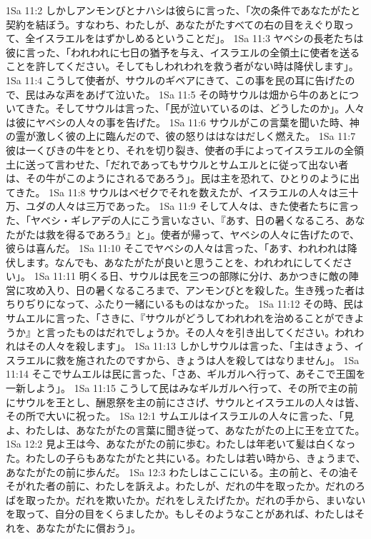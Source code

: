 1Sa 11:2  しかしアンモンびとナハシは彼らに言った、「次の条件であなたがたと契約を結ぼう。すなわち、わたしが、あなたがたすべての右の目をえぐり取って、全イスラエルをはずかしめるということだ」。
1Sa 11:3  ヤベシの長老たちは彼に言った、「われわれに七日の猶予を与え、イスラエルの全領土に使者を送ることを許してください。そしてもしわれわれを救う者がない時は降伏します」。
1Sa 11:4  こうして使者が、サウルのギベアにきて、この事を民の耳に告げたので、民はみな声をあげて泣いた。
1Sa 11:5  その時サウルは畑から牛のあとについてきた。そしてサウルは言った、「民が泣いているのは、どうしたのか」。人々は彼にヤベシの人々の事を告げた。
1Sa 11:6  サウルがこの言葉を聞いた時、神の霊が激しく彼の上に臨んだので、彼の怒りははなはだしく燃えた。
1Sa 11:7  彼は一くびきの牛をとり、それを切り裂き、使者の手によってイスラエルの全領土に送って言わせた、「だれであってもサウルとサムエルとに従って出ない者は、その牛がこのようにされるであろう」。民は主を恐れて、ひとりのように出てきた。
1Sa 11:8  サウルはベゼクでそれを数えたが、イスラエルの人々は三十万、ユダの人々は三万であった。
1Sa 11:9  そして人々は、きた使者たちに言った、「ヤベシ・ギレアデの人にこう言いなさい、『あす、日の暑くなるころ、あなたがたは救を得るであろう』と」。使者が帰って、ヤベシの人々に告げたので、彼らは喜んだ。
1Sa 11:10  そこでヤベシの人々は言った、「あす、われわれは降伏します。なんでも、あなたがたが良いと思うことを、われわれにしてください」。
1Sa 11:11  明くる日、サウルは民を三つの部隊に分け、あかつきに敵の陣営に攻め入り、日の暑くなるころまで、アンモンびとを殺した。生き残った者はちりぢりになって、ふたり一緒にいるものはなかった。
1Sa 11:12  その時、民はサムエルに言った、「さきに、『サウルがどうしてわれわれを治めることができようか』と言ったものはだれでしょうか。その人々を引き出してください。われわれはその人々を殺します」。
1Sa 11:13  しかしサウルは言った、「主はきょう、イスラエルに救を施されたのですから、きょうは人を殺してはなりません」。
1Sa 11:14  そこでサムエルは民に言った、「さあ、ギルガルへ行って、あそこで王国を一新しよう」。
1Sa 11:15  こうして民はみなギルガルへ行って、その所で主の前にサウルを王とし、酬恩祭を主の前にささげ、サウルとイスラエルの人々は皆、その所で大いに祝った。
1Sa 12:1  サムエルはイスラエルの人々に言った、「見よ、わたしは、あなたがたの言葉に聞き従って、あなたがたの上に王を立てた。
1Sa 12:2  見よ王は今、あなたがたの前に歩む。わたしは年老いて髪は白くなった。わたしの子らもあなたがたと共にいる。わたしは若い時から、きょうまで、あなたがたの前に歩んだ。
1Sa 12:3  わたしはここにいる。主の前と、その油そそがれた者の前に、わたしを訴えよ。わたしが、だれの牛を取ったか。だれのろばを取ったか。だれを欺いたか。だれをしえたげたか。だれの手から、まいないを取って、自分の目をくらましたか。もしそのようなことがあれば、わたしはそれを、あなたがたに償おう」。
